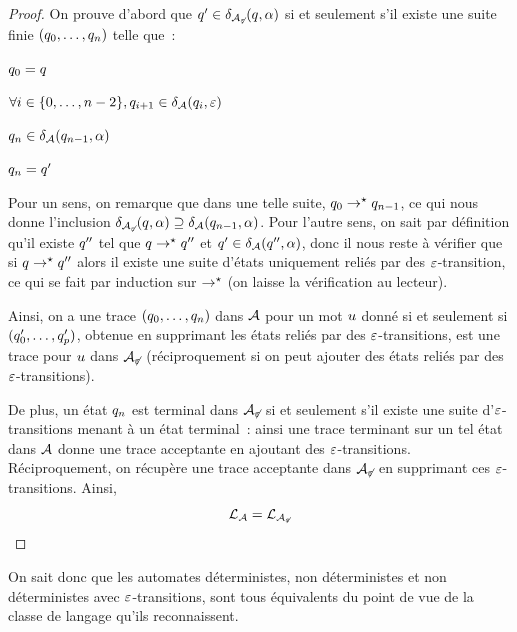\begin{proof}
  On prouve d'abord que $q_{}'\in \delta_{\mathcal{A}_{\not\varepsilon}}(q_{},\alpha)$ si et
  seulement s'il existe une suite finie $(q_{0},\ldots,q_{n})$ telle que~:
  \begin{itemize}
    \begin{minipage}{0.45\textwidth}
    \item $q_{0} = q_{}$
    \item $\forall i \in \{0,\ldots,n-2\},
      q_{i+1} \in \delta_{\mathcal{A}}(q_{i},\varepsilon)$
    \end{minipage}
    \begin{minipage}{0.45\textwidth}
    \item $q_{n} \in \delta_{\mathcal{A}}(q_{n-1},\alpha)$
    \item $q_{n} = q_{}'$
    \end{minipage}
  \end{itemize}
  Pour un sens, on remarque que dans une telle suite,
  $q_{0} \to^{\mathord{\star}} q_{n-1}$, ce qui nous donne l'inclusion
  $\delta_{\mathcal{A}_{\not\varepsilon}}(q_{},\alpha)\supseteq \delta_{\mathcal{A}}(q_{n-1},\alpha)$.
  Pour l'autre sens, on sait par définition qu'il existe $q_{}''$ tel que
  $q_{}\to^{\mathord{\star}} q_{}''$ et $q_{}'\in\delta_{\mathcal{A}} (q_{}'',\alpha)$, donc il nous
  reste à vérifier que si $q_{}\to^{\mathord{\star}}q_{}''$ alors il existe une suite
  d'états uniquement reliés par des $\varepsilon$-transition, ce qui se fait par
  induction sur $\to^{\mathord{\star}}$ (on laisse la vérification au lecteur).

  Ainsi, on a une trace $(q_{0},\ldots,q_{n})$ dans $\mathcal{A}$ pour un mot
  $u$ donné si et seulement si $(q_{0}',\ldots,q_{p}')$, obtenue en
  supprimant les états reliés par des $\varepsilon$-transitions, est une trace pour
  $u$ dans $\mathcal{A}_{\not\varepsilon}$ (réciproquement si on peut ajouter des états
  reliés par des $\varepsilon$-transitions).

  De plus, un état $q_{n}$ est terminal dans $\mathcal{A}_{\not\varepsilon}$ si et
  seulement s'il existe une suite d'$\varepsilon$-transitions menant à un état
  terminal~: ainsi une trace terminant sur un tel état dans $\mathcal{A}$ donne une
  trace acceptante en ajoutant des $\varepsilon$-transitions. Réciproquement, on
  récupère une trace acceptante dans $\mathcal{A}_{\not\varepsilon}$ en supprimant ces
  $\varepsilon$-transitions. Ainsi,
  \[\mathcal L_{\mathcal{A}} = \mathcal L_{\mathcal{A}_{\not\varepsilon}}\qedhere\]
\end{proof}

On sait donc que les automates déterministes, non déterministes et
non déterministes avec $\varepsilon$-transitions, sont tous équivalents du
point de vue de la classe de langage qu'ils reconnaissent.

